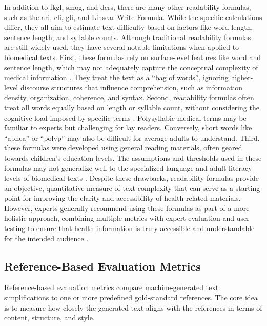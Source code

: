 In addition to \gls{fkgl}, \gls{smog}, and \gls{dcrs}, there are many other readability formulas, such as the \gls{ari}, \gls{cli}, \gls{gfi}, and Linsear Write Formula. While the specific calculations differ, they all aim to estimate text difficulty based on factors like word length, sentence length, and syllable counts.
Although traditional readability formulas are still widely used, they have several notable limitations when applied to biomedical texts. 
First, these formulas rely on surface-level features like word and sentence length, which may not adequately capture the conceptual complexity of medical information \cite{Crossley2022, WANG2013503, Singh2024}.
They treat the text as a ``bag of words'', ignoring higher-level discourse structures that influence comprehension, such as information density, organization, coherence, and syntax.  
Second, readability formulas often treat all words equally based on length or syllable count, without considering the cognitive load imposed by specific terms \cite{Swanson2024}. 
Polysyllabic medical terms may be familiar to experts but challenging for lay readers. Conversely, short words like ``apnea'' or ``polyp'' may also be difficult for average adults to understand.
Third, these formulas were developed using general reading materials, often geared towards children's education levels. 
The assumptions and thresholds used in these formulas may not generalize well to the specialized language and adult literacy levels of biomedical texts \cite{Crossley2022}.
Despite these drawbacks, readability formulas provide an objective, quantitative measure of text complexity that can serve as a starting point for improving the clarity and accessibility of health-related materials. 
However, experts generally recommend using these formulas as part of a more holistic approach, combining multiple metrics with expert evaluation and user testing to ensure that health information is truly accessible and understandable for the intended audience \cite{Ko2024-dd, tanprasert-kauchak-2021-flesch}.

\subsection{Reference-Based Evaluation Metrics}

Reference-based evaluation metrics compare machine-generated text simplifications to one or more predefined gold-standard references.
The core idea is to measure how closely the generated text aligns with the references in terms of content, structure, and style.

